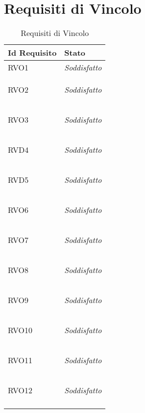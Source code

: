 \section{Requisiti di Vincolo}
\normalsize
\begin{longtable}{|>{\centering}m{5cm}|m{5cm}<{\centering}|}
    \hline
    \textbf{Id Requisito} & \textbf{Stato}\\
    \hline
    \endhead
    \hypertarget{RVO1}{RVO1} & \textit{Soddisfatto}\\ \hline
   
    \hypertarget{RVO2}{RVO2} & \textit{Soddisfatto}\\ \hline
   
    \hypertarget{RVO3}{RVO3} & \textit{Soddisfatto}\\ \hline
   
    \hypertarget{RVD4}{RVD4} & \textit{Soddisfatto}\\ \hline
   
    \hypertarget{RVD5}{RVD5} & \textit{Soddisfatto}\\ \hline
   
    \hypertarget{RVO6}{RVO6} & \textit{Soddisfatto}\\ \hline
   
    \hypertarget{RVO7}{RVO7} & \textit{Soddisfatto}\\ \hline
   
    \hypertarget{RVO8}{RVO8} & \textit{Soddisfatto}\\ \hline
   
    \hypertarget{RVO9}{RVO9} & \textit{Soddisfatto}\\ \hline
   
    \hypertarget{RVO10}{RVO10} & \textit{Soddisfatto}\\ \hline
   
    \hypertarget{RVO11}{RVO11} & \textit{Soddisfatto}\\ \hline
   
    \hypertarget{RVO12}{RVO12} & \textit{Soddisfatto}\\ \hline
   
    \caption[Requisiti di Vincolo]{Requisiti di Vincolo}
    \label{tabella:req3}
\end{longtable}